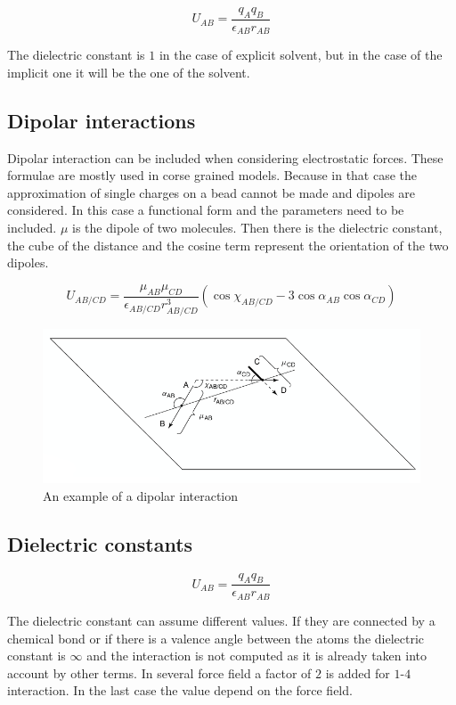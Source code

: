 	$$U_{AB} = \frac{q_Aq_B}{\epsilon_{AB}r_{AB}}$$

	The dielectric constant is $1$ in the case of explicit solvent, but in the case of the implicit one it will be the one of the solvent.

	\subsection{Dipolar interactions}
	Dipolar interaction can be included when considering electrostatic forces.
	These formulae are mostly used in corse grained models.
	Because in that case the approximation of single charges on a bead cannot be made and dipoles are considered.
	In this case a functional form and the parameters need to be included.
	$\mu$ is the dipole of two molecules.
	Then there is the dielectric constant, the cube of the distance and the cosine term represent the orientation of the two dipoles.

	$$U_{AB/CD} = \frac{\mu_{AB}\mu_{CD}}{\epsilon_{AB/CD}r^3_{AB/CD}}(\cos\chi_{AB/CD}-3\cos\alpha_{AB}\cos\alpha_{CD})$$

	\begin{figure}[H]
		\includegraphics[width=\textwidth]{dipolar-interactions}
		\caption{An example of a dipolar interaction}
		\label{fig:dipolar-interactions}
	\end{figure}

	\subsection{Dielectric constants}

	$$U_{AB} = \frac{q_Aq_B}{\epsilon_{AB}r_{AB}}$$

	The dielectric constant can assume different values.
	If they are connected by a chemical bond or if there is a valence angle between the atoms the dielectric constant is $\infty$ and the interaction is not computed as it is already taken into account by other terms.
	In several force field a factor of $2$ is added for $1$-$4$ interaction.
	In the last case the value depend on the force field.

